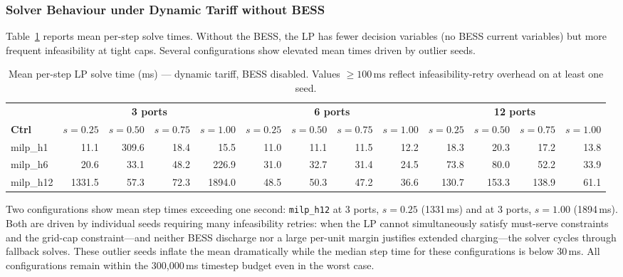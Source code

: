 \subsubsection{Solver Behaviour under Dynamic Tariff without BESS}
\label{subsubsec:gc_dyn_nobess_compute}

Table~\ref{tab:gc_dyn_nobess_compute} reports mean per-step solve times.
Without the BESS, the LP has fewer decision variables (no BESS current
variables) but more frequent infeasibility at tight caps.  Several
configurations show elevated mean times driven by outlier seeds.

\begin{table}[!htb]
\centering
\caption{Mean per-step LP solve time (ms) — dynamic tariff, BESS disabled.
         Values $\geq 100$\,ms reflect infeasibility-retry overhead on
         at least one seed.}
\label{tab:gc_dyn_nobess_compute}
\begin{tabular}{l rrrr rrrr rrrr}
\toprule
 & \multicolumn{4}{c}{\textbf{3 ports}}
 & \multicolumn{4}{c}{\textbf{6 ports}}
 & \multicolumn{4}{c}{\textbf{12 ports}} \\
\cmidrule(lr){2-5}\cmidrule(lr){6-9}\cmidrule(lr){10-13}
\textbf{Ctrl} & $s{=}0.25$ & $s{=}0.50$ & $s{=}0.75$ & $s{=}1.00$
              & $s{=}0.25$ & $s{=}0.50$ & $s{=}0.75$ & $s{=}1.00$
              & $s{=}0.25$ & $s{=}0.50$ & $s{=}0.75$ & $s{=}1.00$ \\
\midrule
milp\_h1  &   11.1 & 309.6 &  18.4 &  15.5 &  11.0 &  11.1 &  11.5 &  12.2 &  18.3 &  20.3 &  17.2 &  13.8 \\
milp\_h6  &   20.6 &  33.1 &  48.2 & 226.9 &  31.0 &  32.7 &  31.4 &  24.5 &  73.8 &  80.0 &  52.2 &  33.9 \\
milp\_h12 & 1331.5 &  57.3 &  72.3 & 1894.0 &  48.5 &  50.3 &  47.2 &  36.6 & 130.7 & 153.3 & 138.9 &  61.1 \\
\bottomrule
\end{tabular}
\end{table}

Two configurations show mean step times exceeding one second:
\texttt{milp\_h12} at 3 ports, $s=0.25$ (1331\,ms) and at 3 ports, $s=1.00$
(1894\,ms).  Both are driven by individual seeds requiring many infeasibility
retries: when the LP cannot simultaneously satisfy must-serve constraints and
the grid-cap constraint—and neither BESS discharge nor a large per-unit margin
justifies extended charging—the solver cycles through fallback solves.  These
outlier seeds inflate the mean dramatically while the median step time for
these configurations is below 30\,ms.  All configurations remain within the
300{,}000\,ms timestep budget even in the worst case.

